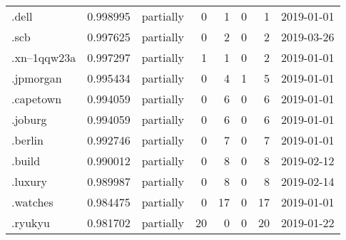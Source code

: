 \begin{tabular}{lrlrrrrl}
.dell                     &          0.998995 &       partially &                           0 &                           1 &                           0 &                   1 &           2019-01-01 \\
.scb                      &          0.997625 &       partially &                           0 &                           2 &                           0 &                   2 &           2019-03-26 \\
.xn--1qqw23a              &          0.997297 &       partially &                           1 &                           1 &                           0 &                   2 &           2019-01-01 \\
.jpmorgan                 &          0.995434 &       partially &                           0 &                           4 &                           1 &                   5 &           2019-01-01 \\
.capetown                 &          0.994059 &       partially &                           0 &                           6 &                           0 &                   6 &           2019-01-01 \\
.joburg                   &          0.994059 &       partially &                           0 &                           6 &                           0 &                   6 &           2019-01-01 \\
.berlin                   &          0.992746 &       partially &                           0 &                           7 &                           0 &                   7 &           2019-01-01 \\
.build                    &          0.990012 &       partially &                           0 &                           8 &                           0 &                   8 &           2019-02-12 \\
.luxury                   &          0.989987 &       partially &                           0 &                           8 &                           0 &                   8 &           2019-02-14 \\
.watches                  &          0.984475 &       partially &                           0 &                          17 &                           0 &                  17 &           2019-01-01 \\
.ryukyu                   &          0.981702 &       partially &                          20 &                           0 &                           0 &                  20 &           2019-01-22 \\

\end{tabular}
